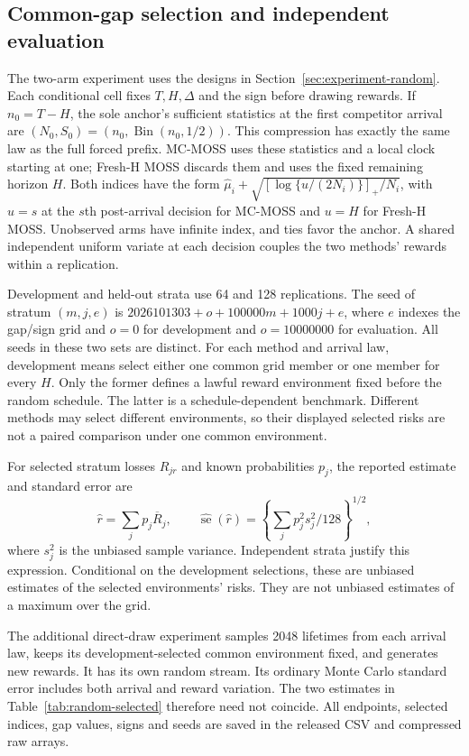 \subsection{Common-gap selection and independent evaluation}
The two-arm experiment uses the designs in Section~\ref{sec:experiment-random}.
Each conditional cell fixes $T,H,\Delta$ and the sign before drawing
rewards. If $n_0=T-H$, the sole anchor's sufficient statistics at the
first competitor arrival are $(N_0,S_0)=(n_0,\operatorname{Bin}(n_0,1/2))$.
This compression has exactly the same law as the full forced prefix.
MC-MOSS uses these statistics and a local clock starting at one;
Fresh-H MOSS discards them and uses the fixed remaining horizon $H$.
Both indices have the form
$\widehat\mu_i+\sqrt{[\log\{u/(2N_i)\}]_+/N_i}$,
with $u=s$ at the $s$th post-arrival decision for MC-MOSS and $u=H$
for Fresh-H MOSS. Unobserved arms have infinite index, and ties favor
the anchor. A shared independent uniform variate at each decision
couples the two methods' rewards within a replication.

Development and held-out strata use 64 and 128 replications. The seed
of stratum $(m,j,e)$ is
$2026101303+o+100000m+1000j+e$, where $e$ indexes the gap/sign grid
and $o=0$ for development and $o=10000000$ for evaluation.
All seeds in these two sets are distinct. For each method and arrival
law, development means select either one common grid member or one
member for every $H$. Only the former defines a lawful reward
environment fixed before the random schedule. The latter is a
schedule-dependent benchmark. Different methods may select different
environments, so their displayed selected risks are not a paired
comparison under one common environment.

For selected stratum losses $R_{jr}$ and known probabilities $p_j$, the
reported estimate and standard error are
\[
 \widehat r=\sum_jp_j\overline R_j,\qquad
 \widehat{\operatorname{se}}(\widehat r)
 =\left\{\sum_jp_j^2s_j^2/128\right\}^{1/2},
\]
where $s_j^2$ is the unbiased sample variance. Independent strata
justify this expression. Conditional on the development selections,
these are unbiased estimates of the selected environments' risks.
They are not unbiased estimates of a maximum over the grid.

The additional direct-draw experiment samples 2048 lifetimes from each
arrival law, keeps its development-selected common environment fixed,
and generates new rewards. It has its own random stream. Its ordinary
Monte Carlo standard error includes both arrival and reward variation.
The two estimates in Table~\ref{tab:random-selected} therefore need not
coincide. All endpoints, selected indices, gap values, signs and seeds
are saved in the released CSV and compressed raw arrays.

